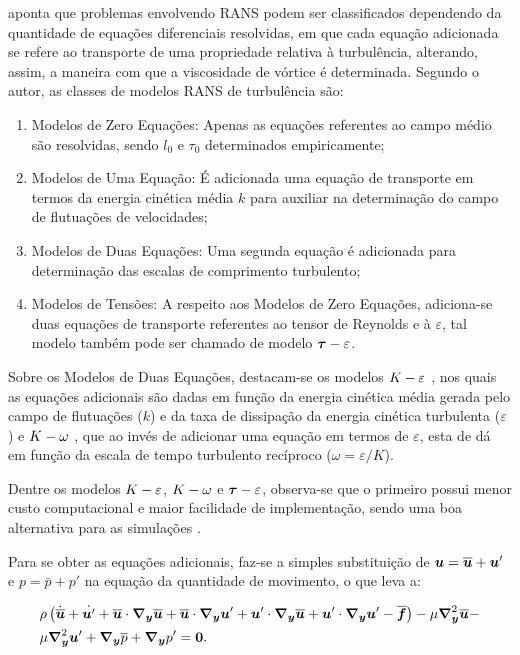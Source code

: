  aponta que problemas envolvendo RANS podem ser classificados dependendo da quantidade de equações diferenciais resolvidas, em que cada equação adicionada se refere ao transporte de uma propriedade relativa à turbulência, alterando, assim, a maneira com que a viscosidade de vórtice é determinada. Segundo o autor, as classes de modelos RANS de turbulência são:

\begin{enumerate}[label=\alph*.]
    \item Modelos de Zero Equações: Apenas as equações referentes ao campo médio são resolvidas, sendo $l_0$ e $\tau_0$ determinados empiricamente;
    \item Modelos de Uma Equação: É adicionada uma equação de transporte em termos da energia cinética média $k$ para auxiliar na determinação do campo de flutuações de velocidades;
    \item Modelos de Duas Equações: Uma segunda equação é adicionada para determinação das escalas de comprimento turbulento;
    \item Modelos de Tensões: A respeito aos Modelos de Zero Equações, adiciona-se duas equações de transporte referentes ao tensor de Reynolds e à $\varepsilon$, tal modelo também pode ser chamado de modelo $\boldsymbol{\tau}-\varepsilon$.
\end{enumerate}

Sobre os Modelos de Duas Equações, destacam-se os modelos $K-\varepsilon$ \cite{haakansson2012experimental,davidson2014pans,parente2011improved}, nos quais as equações adicionais são dadas em função da energia cinética média gerada pelo campo de flutuações ($k$) e da taxa de dissipação da energia cinética turbulenta ($\varepsilon$) e $K-\omega$ \cite{larsen2018over,bassi2005discontinuous}, que ao invés de adicionar uma equação em termos de $\varepsilon$, esta de dá em função da escala de tempo turbulento recíproco ($\omega=\varepsilon/K$).

Dentre os modelos $K-\varepsilon$, $K-\omega$ e $\boldsymbol{\tau}-\varepsilon$, observa-se que o primeiro possui menor custo computacional e maior facilidade de implementação, sendo uma boa alternativa para as simulações \cite{koutsourakis2012evaluation,adanta2020comparison}.

Para se obter as equações adicionais, faz-se a simples substituição de $\boldsymbol{u}=\overline{\boldsymbol{u}}+\boldsymbol{u}'$ e $p=\bar{p}+p'$ na equação da quantidade de movimento, o que leva a:

\begin{equation}
    \begin{split}
        &\rho\left({\dot{\overline{\boldsymbol{u}}}+\dot{\boldsymbol{u}'}+\overline{\boldsymbol{u}}\cdot\boldsymbol{\nabla_y}\overline{\boldsymbol{u}}+\overline{\boldsymbol{u}}\cdot\boldsymbol{\nabla_y}\boldsymbol{u}'+\boldsymbol{u}'\cdot\boldsymbol{\nabla_y}\overline{\boldsymbol{u}}+\boldsymbol{u}'\cdot\boldsymbol{\nabla_y}\boldsymbol{u}'-\overline{\boldsymbol{f}}}\right)-\mu\boldsymbol{\nabla}^2_{\boldsymbol{y}}\overline{\boldsymbol{u}}-\\
        &\mu\boldsymbol{\nabla}^2_{\boldsymbol{y}}\boldsymbol{u}'+\boldsymbol{\nabla_y}\overline{p}+\boldsymbol{\nabla_y} p'=\boldsymbol{0}\text{.}
    \end{split}
    \label{eq:NS-RANS1}
\end{equation}

